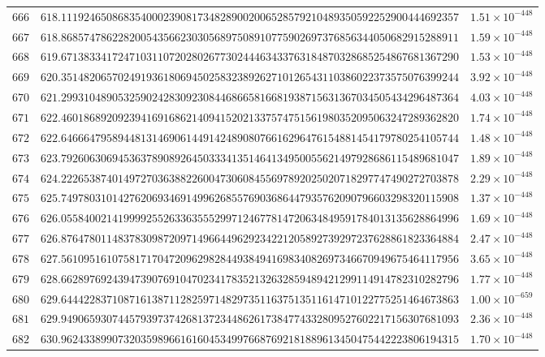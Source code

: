 \documentclass[12pt,reqno]{amsart}
\theoremstyle{remark}
\begin{document}
\begin{longtable}{clc}
$666$ & $618.1119246508683540002390817348289002006528579210489350592252900444692357$ & $1.51\times 10^{-448}$ \\
$667$ & $618.8685747862282005435662303056897508910775902697376856344050682915288911$ & $1.59\times 10^{-448}$ \\
$668$ & $619.6713833417247103110720280267730244463433763184870328685254867681367290$ & $1.53\times 10^{-448}$ \\
$669$ & $620.3514820657024919361806945025832389262710126543110386022373575076399244$ & $3.92\times 10^{-448}$ \\
$670$ & $621.2993104890532590242830923084468665816681938715631367034505434296487364$ & $4.03\times 10^{-448}$ \\
$671$ & $622.4601868920923941691686214094152021337574751561980352095063247289362820$ & $1.74\times 10^{-448}$ \\
$672$ & $622.6466647958944813146906144914248908076616296476154881454179780254105744$ & $1.48\times 10^{-448}$ \\
$673$ & $623.7926063069453637890892645033341351464134950055621497928686115489681047$ & $1.89\times 10^{-448}$ \\
$674$ & $624.2226538740149727036388226004730608455697892025020718297747490272703878$ & $2.29\times 10^{-448}$ \\
$675$ & $625.7497803101427620693469149962685576903686447935762090796603298320115908$ & $1.37\times 10^{-448}$ \\
$676$ & $626.0558400214199992552633635552997124677814720634849591784013135628864996$ & $1.69\times 10^{-448}$ \\
$677$ & $626.8764780114837830987209714966449629234221205892739297237628861823364884$ & $2.47\times 10^{-448}$ \\
$678$ & $627.5610951610758171704720962982844938494169834082697346670949675464117956$ & $3.65\times 10^{-448}$ \\
$679$ & $628.6628976924394739076910470234178352132632859489421299114914782310282796$ & $1.77\times 10^{-448}$ \\
$680$ & $629.6444228371087161387112825971482973511637513511614710122775251464673863$ & $1.00\times 10^{-659}$ \\
$681$ & $629.9490659307445793973742681372344862617384774332809527602217156307681093$ & $2.36\times 10^{-448}$ \\
$682$ & $630.9624338990732035989661616045349976687692181889613450475442223806194315$ & $1.70\times 10^{-448}$ \\

\end{longtable}
\end{document}

